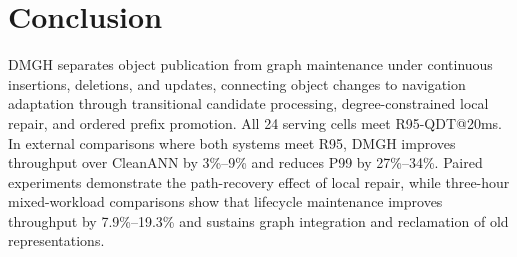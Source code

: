 \documentclass[sigconf,pbalance]{acmart}
\begin{document}
\section{Conclusion}
\label{sec:conclusion}

DMGH separates object publication from graph maintenance under continuous insertions, deletions, and updates, connecting object changes to navigation adaptation through transitional candidate processing, degree-constrained local repair, and ordered prefix promotion. All 24 serving cells meet R95-QDT@20ms. In external comparisons where both systems meet R95, DMGH improves throughput over CleanANN by 3\%--9\% and reduces P99 by 27\%--34\%. Paired experiments demonstrate the path-recovery effect of local repair, while three-hour mixed-workload comparisons show that lifecycle maintenance improves throughput by 7.9\%--19.3\% and sustains graph integration and reclamation of old representations.

\FloatBarrier
\label{page:body-end}



\end{document}
